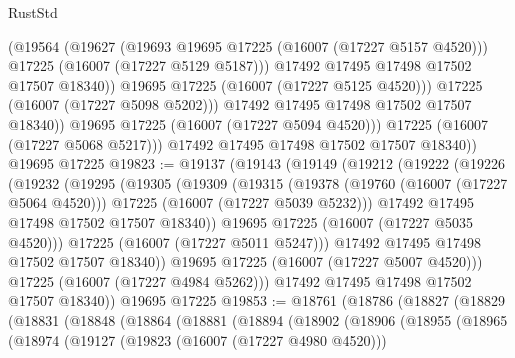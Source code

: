 \begin{lexlean}{RustStd}
\begin{coremodule}
                      (@19564
                        (@19627
                          (@19693 @19695 @17225 (@16007 (@17227 @5157 @4520)))
                          @17225
                          (@16007 (@17227 @5129 @5187)))
                        @17492
                        @17495
                        @17498
                        @17502
                        @17507
                        @18340))
                    @19695
                    @17225
                    (@16007 (@17227 @5125 @4520)))
                  @17225
                  (@16007 (@17227 @5098 @5202)))
                @17492
                @17495
                @17498
                @17502
                @17507
                @18340))
            @19695
            @17225
            (@16007 (@17227 @5094 @4520)))
          @17225
          (@16007 (@17227 @5068 @5217)))
        @17492
        @17495
        @17498
        @17502
        @17507
        @18340))
    @19695
    @17225
@19823 := @19137
    (@19143
      (@19149
        (@19212
          (@19222
            (@19226
              (@19232
                (@19295
                  (@19305
                    (@19309
                      (@19315
                        (@19378
                          (@19760 (@16007 (@17227 @5064 @4520)))
                          @17225
                          (@16007 (@17227 @5039 @5232)))
                        @17492
                        @17495
                        @17498
                        @17502
                        @17507
                        @18340))
                    @19695
                    @17225
                    (@16007 (@17227 @5035 @4520)))
                  @17225
                  (@16007 (@17227 @5011 @5247)))
                @17492
                @17495
                @17498
                @17502
                @17507
                @18340))
            @19695
            @17225
            (@16007 (@17227 @5007 @4520)))
          @17225
          (@16007 (@17227 @4984 @5262)))
        @17492
        @17495
        @17498
        @17502
        @17507
        @18340))
    @19695
    @17225
@19853 := @18761
    (@18786
      (@18827
        (@18829
          (@18831
            (@18848
              (@18864
                (@18881
                  (@18894
                    (@18902
                      (@18906
                        (@18955
                          (@18965
                            (@18974
                              (@19127
                                (@19823 (@16007 (@17227 @4980 @4520)))

\end{coremodule}
\end{lexlean}
